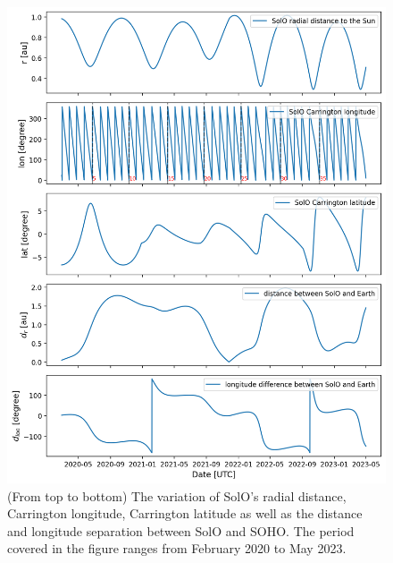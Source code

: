 



\begin{figure}
    \centering
    \includegraphics[width = \textwidth]{images/ACR/SOLO_orbit_helioscentric_3.png}
    \caption[The orbit variation of \ac{SolO} in Carrington coordinate system]{(From top to bottom) The variation of \ac{SolO}'s radial distance, Carrington longitude, Carrington latitude as well as the distance and longitude separation between \ac{SolO} and \ac{SOHO}. The period covered in the figure ranges from February 2020 to May 2023. }
    \label{fig:SOLO_orbit_info}
\end{figure}
